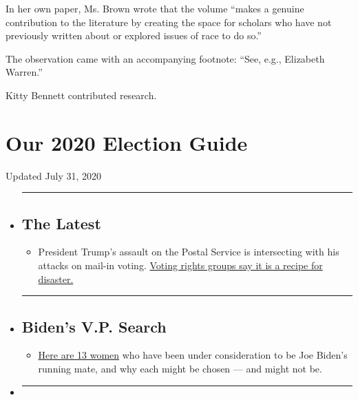 In her own paper, Ms. Brown wrote that the volume ``makes a genuine
contribution to the literature by creating the space for scholars who
have not previously written about or explored issues of race to do so.''

The observation came with an accompanying footnote: ``See, e.g.,
Elizabeth Warren.''

Kitty Bennett contributed research.

\hypertarget{our-2020-election-guide}{%
\section{Our 2020 Election Guide}\label{our-2020-election-guide}}

Updated July 31, 2020

\begin{itemize}
\item
  \begin{center}\rule{0.5\linewidth}{\linethickness}\end{center}

  \hypertarget{the-latest}{%
  \subsection{The Latest}\label{the-latest}}

  \begin{itemize}
  \tightlist
  \item
    President Trump's assault on the Postal Service is intersecting with
    his attacks on mail-in voting.
    \href{https://www.nytimes3xbfgragh.onion/2020/07/31/us/politics/trump-usps-mail-delays.html?action=click\&pgtype=Article\&state=default\&region=BELOW_MAIN_CONTENT\&context=storylines_guide}{Voting
    rights groups say it is a recipe for disaster.}
  \end{itemize}
\item
  \begin{center}\rule{0.5\linewidth}{\linethickness}\end{center}

  \hypertarget{bidens-vp-search}{%
  \subsection{Biden's V.P. Search}\label{bidens-vp-search}}

  \begin{itemize}
  \tightlist
  \item
    \href{https://www.nytimes3xbfgragh.onion/article/biden-vice-president-2020.html?action=click\&pgtype=Article\&state=default\&region=BELOW_MAIN_CONTENT\&context=storylines_guide}{Here
    are 13 women} who have been under consideration to be Joe Biden's
    running mate, and why each might be chosen --- and might not be.
  \end{itemize}
\item
  \begin{center}\rule{0.5\linewidth}{\linethickness}\end{center}


\end{itemize}
